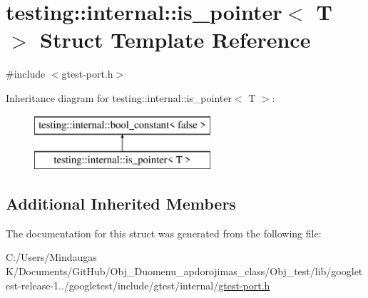 \hypertarget{structtesting_1_1internal_1_1is__pointer}{}\section{testing\+::internal\+::is\+\_\+pointer$<$ T $>$ Struct Template Reference}
\label{structtesting_1_1internal_1_1is__pointer}


{\ttfamily \#include $<$gtest-\/port.\+h$>$}

Inheritance diagram for testing\+::internal\+::is\+\_\+pointer$<$ T $>$\+:\begin{figure}[H]
\begin{center}
\leavevmode
\includegraphics[height=2.000000cm]{de/d83/structtesting_1_1internal_1_1is__pointer}
\end{center}
\end{figure}
\subsection*{Additional Inherited Members}


The documentation for this struct was generated from the following file\+:\begin{DoxyCompactItemize}
\item 
C\+:/\+Users/\+Mindaugas K/\+Documents/\+Git\+Hub/\+Obj\+\_\+\+Duomenu\+\_\+apdorojimas\+\_\+class/\+Obj\+\_\+test/lib/googletest-\/release-\/1../googletest/include/gtest/internal/\mbox{\hyperlink{_obj__test_2lib_2googletest-release-1_88_81_2googletest_2include_2gtest_2internal_2gtest-port_8h}{gtest-\/port.\+h}}\end{DoxyCompactItemize}
